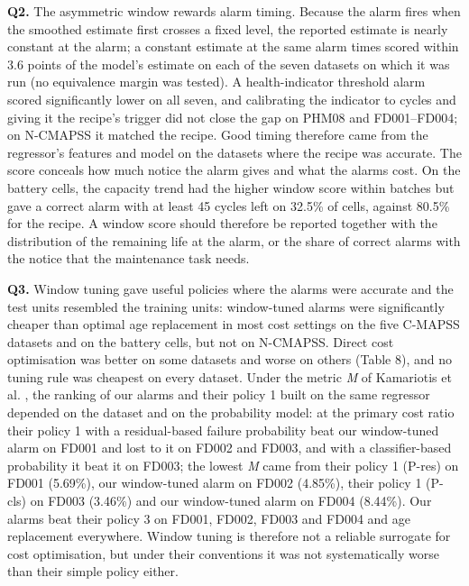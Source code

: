 \documentclass[a4paper,fleqn,doubleblind]{cas-dc}
\begin{document}
\textbf{Q2.} The asymmetric window rewards alarm timing. Because the alarm fires when the smoothed estimate first crosses a fixed level, the reported estimate is nearly constant at the alarm; a constant estimate at the same alarm times scored within 3.6 points of the model's estimate on each of the seven datasets on which it was run (no equivalence margin was tested). A health-indicator threshold alarm scored significantly lower on all seven, and calibrating the indicator to cycles and giving it the recipe's trigger did not close the gap on PHM08 and FD001--FD004; on N-CMAPSS it matched the recipe. Good timing therefore came from the regressor's features and model on the datasets where the recipe was accurate. The score conceals how much notice the alarm gives and what the alarms cost. On the battery cells, the capacity trend had the higher window score within batches but gave a correct alarm with at least 45 cycles left on 32.5\% of cells, against 80.5\% for the recipe. A window score should therefore be reported together with the distribution of the remaining life at the alarm, or the share of correct alarms with the notice that the maintenance task needs.

\textbf{Q3.} Window tuning gave useful policies where the alarms were accurate and the test units resembled the training units: window-tuned alarms were significantly cheaper than optimal age replacement in most cost settings on the five C-MAPSS datasets and on the battery cells, but not on N-CMAPSS. Direct cost optimisation was better on some datasets and worse on others (Table 8), and no tuning rule was cheapest on every dataset. Under the metric \textit{M} of Kamariotis et al. \cite{kamariotis2024}, the ranking of our alarms and their policy 1 built on the same regressor depended on the dataset and on the probability model: at the primary cost ratio their policy 1 with a residual-based failure probability beat our window-tuned alarm on FD001 and lost to it on FD002 and FD003, and with a classifier-based probability it beat it on FD003; the lowest \textit{M} came from their policy 1 (P-res) on FD001 (5.69\%), our window-tuned alarm on FD002 (4.85\%), their policy 1 (P-cls) on FD003 (3.46\%) and our window-tuned alarm on FD004 (8.44\%). Our alarms beat their policy 3 on FD001, FD002, FD003 and FD004 and age replacement everywhere. Window tuning is therefore not a reliable surrogate for cost optimisation, but under their conventions it was not systematically worse than their simple policy either.
\end{document}
